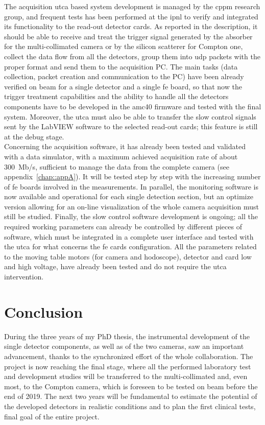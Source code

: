 The acquisition \gls{utca} based system development is managed by the \gls{cppm} research group, and frequent tests has been performed at the \gls{ipnl} to verify and integrated its functionality to the read-out detector cards. As reported in the description, it should be able to receive and treat the trigger signal generated by the absorber for the multi-collimated camera or by the silicon scatterer for Compton one, collect the data flow from all the detectors, group them into \gls{udp} packets with the proper format and send them to the acquisition PC. The main tasks (data collection, packet creation and communication to the PC) have been already verified on beam for a single detector and a single \gls{fe} board, so that now the trigger treatment capabilities and the ability to handle all the detectors components have to be developed in the \gls{amc}40 firmware and tested with the final system. Moreover, the \gls{utca} must also be able to transfer the slow control signals sent by the LabVIEW software to the selected read-out cards; this feature is still at the debug stage.\\
Concerning the acquisition software, it has already been tested and validated with a data simulator, with a maximum achieved acquisition rate of about 300~Mb/s, sufficient to manage the data from the complete camera (see appendix~\ref{chap::appA}). It will be tested step by step with the increasing number of \gls{fe} boards involved in the measurements. In parallel, the monitoring software is now available and operational for each single detection section, but an optimize version allowing for an on-line visualization of the whole camera acquisition must still be studied. Finally, the slow control software development is ongoing; all the required working parameters can already be controlled by different pieces of software, which must be integrated in a complete user interface and tested with the \gls{utca} for what concerns the \gls{fe} cards configuration. All the parameters related to the moving table motors (for camera and hodoscope), detector and card low and high voltage, have already been tested and do not require the \gls{utca} intervention.        

\section{Conclusion}\label{chap3::sec::conclusion}

During the three years of my PhD thesis, the instrumental development of the single detector components, as well as of the two cameras, saw an important advancement, thanks to the synchronized effort of the whole collaboration. The project is now reaching the final stage, where all the performed laboratory test and development studies will be transferred to the multi-collimated and, even most, to the Compton camera, which is foreseen to be tested on beam before the end of 2019. The next two years will be fundamental to estimate the potential of the developed detectors in realistic conditions and to plan the first clinical tests, final goal of the entire project. 





\clearpage
